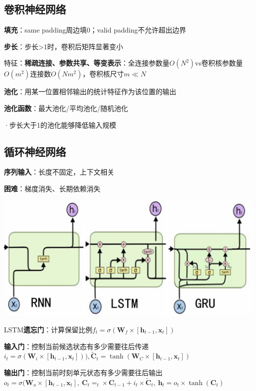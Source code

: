 	
	\subsection*{卷积神经网络}
	
	\textbf{填充}：same padding周边填0；valid padding不允许超出边界
	
	\textbf{步长}：步长>1时，卷积后矩阵显著变小
	
	特征：\textbf{稀疏连接、参数共享、等变表示}：全连接参数量$O(N^2)$vs卷积核参数量$O(m^2)$连接数$O(Nm^2)$，卷积核尺寸$m\ll N$
	
	\textbf{池化}：用某一位置相邻输出的统计特征作为该位置的输出
	
	\textbf{池化函数}：最大池化/平均池化/随机池化
	
	·步长大于1的池化能够降低输入规模
	
	\subsection*{循环神经网络}
	
	\textbf{序列输入}：长度不固定，上下文相关
	
	\textbf{困难}：梯度消失、长期依赖消失
	
	\begin{figurehere}
		\centering
		\includegraphics[width=1\linewidth]{image06}
		\label{fig:image06}
	\end{figurehere}
	
	LSTM\textbf{遗忘门}：计算保留比例$f_t=\sigma(\mathbf{W}_f\times[\mathbf{h}_{t-1},\mathbf{x}_t])$
	
	\textbf{输入门}：控制当前候选状态有多少需要往后传递$i_t=\sigma(\mathbf{W}_i\times[\mathbf{h}_{t-1},\mathbf{x}_t])), \tilde{\mathbf{C}}_t = \tanh(\mathbf{W}_C \times [\mathbf{h}_{t-1}, \mathbf{x}_t])$
	
	\textbf{输出门}：控制当前时刻单元状态有多少需要往后输出$o_t = \sigma(\mathbf{W}_o \times [\mathbf{h}_{t-1}, \mathbf{x}_t],~ \mathbf{C}_t = _t \times \mathbf{C}_{t-1} + i_t \times \tilde{\mathbf{C}}_t,~ \mathbf{h}_t = o_t \times \tanh(\mathbf{C}_t)$
	
